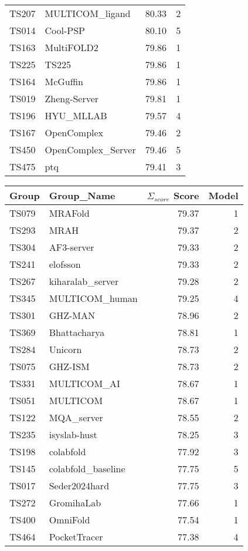 \begin{table*}[ht]
\begin{minipage}[t]{0.48\textwidth}
\begin{tabular}{llrr}
TS207 & MULTICOM\_ligand & 80.33 & 2 \\ 
TS014 & Cool-PSP & 80.10 & 5 \\ 
TS163 & MultiFOLD2 & 79.86 & 1 \\ 
TS225 & TS225 & 79.86 & 1 \\ 
TS164 & McGuffin & 79.86 & 1 \\ 
TS019 & Zheng-Server & 79.81 & 1 \\ 
TS196 & HYU\_MLLAB & 79.57 & 4 \\ 
TS167 & OpenComplex & 79.46 & 2 \\ 
TS450 & OpenComplex\_Server & 79.46 & 5 \\ 
TS475 & ptq & 79.41 & 3 \\ 
\bottomrule
\end{tabular}
\end{minipage}
\hfill
\begin{minipage}[t]{0.48\textwidth}
\centering
\begin{tabular}{llrr}
\toprule
Group & Group\_Name & $\Sigma_{score}$ Score & Model \\ 
\midrule
TS079 & MRAFold & 79.37 & 1 \\ 
TS293 & MRAH & 79.37 & 2 \\ 
TS304 & AF3-server & 79.33 & 2 \\ 
TS241 & elofsson & 79.33 & 2 \\ 
TS267 & kiharalab\_server & 79.28 & 2 \\ 
TS345 & MULTICOM\_human & 79.25 & 4 \\ 
TS301 & GHZ-MAN & 78.96 & 2 \\ 
TS369 & Bhattacharya & 78.81 & 1 \\ 
TS284 & Unicorn & 78.73 & 2 \\ 
TS075 & GHZ-ISM & 78.73 & 2 \\ 
TS331 & MULTICOM\_AI & 78.67 & 1 \\ 
TS051 & MULTICOM & 78.67 & 1 \\ 
TS122 & MQA\_server & 78.55 & 2 \\ 
TS235 & isyslab-hust & 78.25 & 3 \\ 
TS198 & colabfold & 77.92 & 3 \\ 
TS145 & colabfold\_baseline & 77.75 & 5 \\ 
TS017 & Seder2024hard & 77.75 & 3 \\ 
TS272 & GromihaLab & 77.66 & 1 \\ 
TS400 & OmniFold & 77.54 & 1 \\ 
TS464 & PocketTracer & 77.38 & 4 \\ 

\end{tabular}
\end{minipage}
\end{table*}

